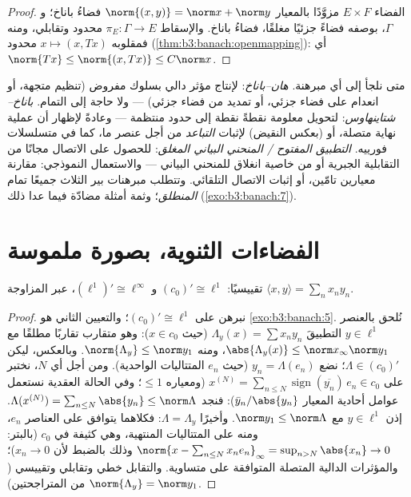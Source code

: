\begin{proof}
الفضاء $E \times F$ مزوَّدًا بالمعيار $\norm{(x,y)} = \norm x + \norm y$ فضاءُ باناخ؛ و $\Gamma$،
بوصفه فضاءً جزئيًا مغلقًا، فضاءُ باناخ. والإسقاط $\pi_E\colon \Gamma \to E$ محدود
وتقابلي، ومنه فمقلوبه $x \mapsto (x, Tx)$ محدود (\cref{thm:b3:banach:openmapping}): أي $\norm{Tx} \leq \norm{(x,
Tx)} \leq C\norm x$.
\end{proof}

\begin{method}\label{met:b3:banach:trilogy}
متى نلجأ إلى أي مبرهنة. \emph{هان--باناخ}: لإنتاج مؤثر دالي
بسلوك مفروض (تنظيم متجهة، أو انعدام على فضاء جزئي، أو تمديد من
فضاء جزئي) --- ولا حاجة إلى التمام. \emph{باناخ--شتاينهاوس}:
لتحويل معلومة نقطةً نقطة إلى حدود منتظمة --- وعادةً لإظهار أن
عملية نهاية متصلة، أو (بعكس النقيض) لإثبات \emph{التباعد} من
أجل عنصر ما، كما في متسلسلات فورييه. \emph{التطبيق المفتوح /
المنحني البياني المغلق}: للحصول على الاتصال مجانًا من التقابلية
الجبرية أو من خاصية انغلاق للمنحني البياني --- والاستعمال
النموذجي: مقارنة معيارين تامّين، أو إثبات الاتصال التلقائي.
وتتطلب مبرهنات بير الثلاث جميعًا تمام \emph{المنطلق}؛ وثمة
أمثلة مضادّة فيما عدا ذلك (\cref{exo:b3:banach:7}).
\end{method}

\section{الفضاءات الثنوية، بصورة ملموسة}

\begin{theorem}\label{thm:b3:banach:duals}
تقييسيًا: $(c_0)' \cong \ell^1$ و $(\ell^1)' \cong
\ell^\infty$، عبر المزاوجة
$\langle x, y\rangle = \sum_n
x_ny_n$.
\end{theorem}

\begin{proof}
نبرهن على $(c_0)' \cong \ell^1$؛ والتعيين الثاني هو \cref{exo:b3:banach:5}. نُلحق
بالعنصر $y \in \ell^1$ التطبيقَ $\Lambda_y(x)
= \sum x_ny_n$ (حيث $x \in c_0$): وهو
متقارب تقاربًا مطلقًا مع $\abs{\Lambda_y(x)} \leq \norm x_\infty\norm y_1$، ومنه $\norm{\Lambda_y} \leq \norm y_1$. وبالعكس، ليكن
$\Lambda \in
(c_0)'$؛ نضع $y_n = \Lambda(e_n)$ (حيث $e_n$ المتتاليات الواحدية). ومن أجل
أي $N$، نختبر على $x^{(N)} = \sum_{n \leq N}
\operatorname{sign}(\overline{y_n})\,e_n \in c_0$ (ومعياره $\leq
1$؛ وفي الحالة العقدية
نستعمل عوامل أحادية المعيار $\bar y_n/\abs
{y_n}$): فنجد $\Lambda(x^{(N)}) = \sum_{n\leq N}\abs{y_n} \leq
\norm\Lambda$. إذن
$y \in \ell^1$ مع $\norm y_1 \leq
\norm\Lambda$. وأخيرًا $\Lambda = \Lambda_y$: فكلاهما يتوافق على
العناصر $e_n$، ومنه على المتتاليات المنتهية، وهي كثيفة في $c_0$
(بالبتر: $\norm{x - \sum_{n \leq N}x_ne_n}_\infty = \sup_{n > N}\abs{x_n}
\to 0$ وذلك بالضبط لأن $x_n \to 0$)؛ والمؤثرات
الدالية المتصلة المتوافقة على  متساوية. والتقابل
خطي وتقابلي وتقييسي ($\norm{\Lambda_y} = \norm y_1$ من المتراجحتين).
\end{proof}

